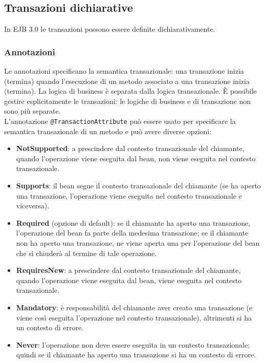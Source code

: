 \subsection{Transazioni dichiarative}
In EJB 3.0 le transazioni possono essere definite dichiarativamente.
\subsubsection{Annotazioni}
Le annotazioni specificano la semantica transazionale: una transazione inizia (termina) quando l’esecuzione di un metodo associato a una transazione inizia (termina). La logica di business è separata dalla logica transazionale. È possibile gestire esplicitamente le transazioni: le logiche di business e di transazione non sono più separate.\\

L’annotazione \texttt{@TransactionAttribute} può essere usato per specificare la semantica transazionale di un metodo e può avere diverse opzioni: 
\begin{itemize}
    \item \textbf{NotSupported}: a prescindere dal contesto transazionale del chiamante, quando l’operazione viene eseguita dal bean, non viene eseguita nel contesto transazionale.
    \item \textbf{Supports}: il bean segue il contesto transazionale del chiamante (se ha aperto una transazione, l’operazione viene eseguita nel contesto transazionale e viceversa).
    \item \textbf{Required} (opzione di default): se il chiamante ha aperto una transazione, l’operazione del bean fa parte della medesima transazione; se il chiamante non ha aperto una transazione, ne viene aperta una per l’operazione del bean che si chiuderà al termine di tale operazione.
    \item \textbf{RequiresNew}: a prescindere dal contesto transazionale del chiamante, quando l’operazione viene eseguita dal bean, viene eseguita nel contesto transazionale.
    \item \textbf{Mandatory}: è responsabilità del chiamante aver creato una transazione (e viene così eseguita l’operazione nel contesto transazionale), altrimenti si ha un contesto di errore.
    \item \textbf{Never}: l’operazione non deve essere eseguita in un contesto transazionale; quindi se il chiamante ha aperto una transazione si ha un contesto di errore.
\end{itemize}

